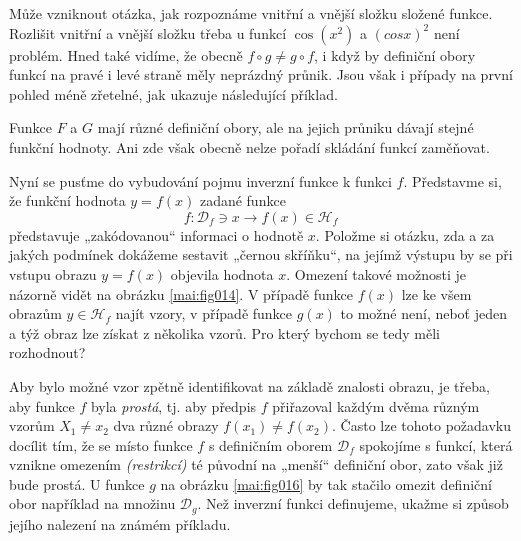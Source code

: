          
      
      Může vzniknout otázka, jak rozpoznáme vnitřní a vnější složku složené funkce. Rozlišit 
      vnitřní a vnější složku třeba u funkcí \(\cos(x^2)\) a \((cos x)^2\) není problém. Hned také 
      vidíme, že obecně \(f\circ g\neq g\circ f\), i když by definiční obory funkcí na pravé i levé 
      straně měly neprázdný průnik. Jsou však i případy na první pohled méně zřetelné, jak ukazuje 
      následující příklad.
      
        
       
      Funkce \(F\) a \(G\) mají různé definiční obory, ale na jejich průniku dávají stejné funkční 
      hodnoty. Ani zde však obecně nelze pořadí skládání funkcí zaměňovat.
      
      Nyní se pusťme do vybudování pojmu inverzní funkce k funkci \(f\). Představme si, že funkční
      hodnota \(y = f(x)\) zadané funkce
      \begin{equation*}
        f: \mathcal{D}_f\ni x \rightarrow f(x)\in\mathcal{H}_f
      \end{equation*}
      představuje „zakódovanou“ informaci o hodnotě \(x\). Položme si otázku, zda a za jakých 
      podmínek dokážeme sestavit „černou skříňku“, na jejímž výstupu by se při vstupu obrazu \(y = 
      f(x)\) objevila hodnota \(x\). Omezení takové možnosti je názorně vidět na obrázku 
      \ref{mai:fig014}. V případě funkce \(f(x)\) lze ke všem obrazům \(y \in \mathcal{H}_f\) najít 
      vzory, v případě funkce \(g(x)\) to možné není, neboť jeden a týž obraz lze získat z několika 
      vzorů. Pro který bychom se tedy měli rozhodnout?
      

       Aby bylo možné vzor zpětně identifikovat na základě znalosti obrazu, je třeba, aby funkce 
       \(f\) byla \emph{prostá}, tj. aby předpis \(f\) přiřazoval každým dvěma různým vzorům \(X_1 
       \neq x_2\) dva různé obrazy \(f(x_1) \neq f(x_2)\). Často lze tohoto požadavku docílit tím, 
       že se místo funkce \(f\) s definičním oborem \(\mathcal{D}_f\) spokojíme s funkcí, která 
       vznikne omezením \emph{(restrikcí)} té původní na „menší“ definiční obor, zato však již bude 
       prostá. U funkce \(g\) na obrázku \ref{mai:fig016} by tak stačilo omezit definiční obor 
       například na množinu \(\mathcal{D}_g\). Než inverzní funkci definujeme, ukažme si způsob 
       jejího nalezení na známém příkladu.

